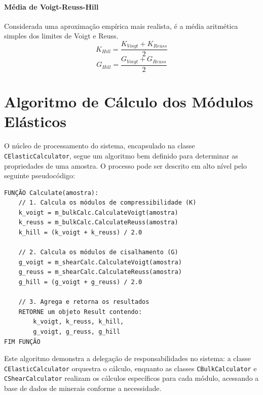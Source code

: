 \paragraph{Média de Voigt-Reuss-Hill}
Considerada uma aproximação empírica mais realista, é a média aritmética simples dos limites de Voigt e Reuss.
\begin{equation}
    K_{Hill} = \frac{K_{Voigt} + K_{Reuss}}{2}
\end{equation}
\begin{equation}
    G_{Hill} = \frac{G_{Voigt} + G_{Reuss}}{2}
\end{equation}

\section{Algoritmo de Cálculo dos Módulos Elásticos}

O núcleo de processamento do sistema, encapsulado na classe \texttt{CElasticCalculator}, segue um algoritmo bem definido para determinar as propriedades de uma amostra. O processo pode ser descrito em alto nível pelo seguinte pseudocódigo:

\begin{verbatim}
FUNÇÃO Calculate(amostra):
    // 1. Calcula os módulos de compressibilidade (K)
    k_voigt = m_bulkCalc.CalculateVoigt(amostra)
    k_reuss = m_bulkCalc.CalculateReuss(amostra)
    k_hill = (k_voigt + k_reuss) / 2.0
    
    // 2. Calcula os módulos de cisalhamento (G)
    g_voigt = m_shearCalc.CalculateVoigt(amostra)
    g_reuss = m_shearCalc.CalculateReuss(amostra)
    g_hill = (g_voigt + g_reuss) / 2.0
    
    // 3. Agrega e retorna os resultados
    RETORNE um objeto Result contendo:
        k_voigt, k_reuss, k_hill,
        g_voigt, g_reuss, g_hill
FIM FUNÇÃO
\end{verbatim}
Este algoritmo demonstra a delegação de responsabilidades no sistema: a classe \texttt{CElasticCalculator} orquestra o cálculo, enquanto as classes \texttt{CBulkCalculator} e \texttt{CShearCalculator} realizam os cálculos específicos para cada módulo, acessando a base de dados de minerais conforme a necessidade.


